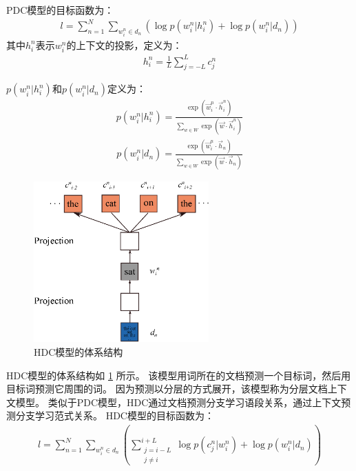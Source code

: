 PDC模型的目标函数为：
\begin{align}
  l = \sum_{n=1}^N \sum_{w_i^n \in d_n}%
  \left( \log p(w_i^n|h_i^n) + \log p(w_i^n|d_n)\right)
  \label{eqn:jointly-pdc-objective}
\end{align}
其中$h_i^n$表示$w_i^n$的上下文的投影，定义为：
\begin{align}
  h_i^n = \frac{1}{L} \sum_{j=-L}^{L} c^n_j
  \label{eqn:jointly-pdc-context}
\end{align}

$p(w_i^n|h_i^n)$和$p(w_i^n|d_n)$定义为：
\begin{align}
  p(w_i^n|h_i^n) = \frac{\exp(\vec{w}_i^n \cdot \vec{h}_i^n)}%
  {\sum_{w\in W}\exp(\vec{w}\cdot\vec{h}_i^n)}
  \label{eqn:jointly-pdc-word}
\end{align}
\begin{align}
  p(w_i^n|d_n) = \frac{\exp(\vec{w}_i^n \cdot \vec{h}_n)}%
  {\sum_{w\in W}\exp(\vec{w}\cdot\vec{h}_n)}
  \label{eqn:jointly-pdc-doc}
\end{align}

\begin{figure}
  \includegraphics[width=0.6\textwidth]{figures/hierachical-model.eps}
  \centering
  \caption{HDC模型的体系结构\cite{DBLP:conf/acl/SunGLXC15}}
  \label{fig:jointly-hdc}
\end{figure}

HDC模型的体系结构如 \cref{fig:jointly-hdc} 所示。
该模型用词所在的文档预测一个目标词，然后用目标词预测它周围的词。
因为预测以分层的方式展开，该模型称为分层文档上下文模型。
类似于PDC模型，HDC通过文档预测分支学习语段关系，通过上下文预测分支学习范式关系。
HDC模型的目标函数为：
\begin{align}
  l = \sum_{n=1}^N \sum_{w_i^n \in d_n}%
  \left(\sum_{\substack{j=i-L\\ j \neq i}}^{i+L}%
  \log p(c_j^n|w_i^n)+\log p(w_i^n|d_n)\right)
  \label{eqn:jointly-hdc-objective}
\end{align}


